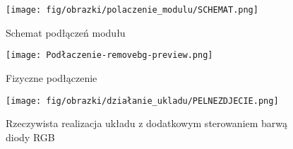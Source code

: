 \documentclass[11pt, a4paper]{article}
\begin{document}


\vspace{0.5cm}
\begin{figure}[h!]
    \centering
    \texttt{[image: fig/obrazki/polaczenie\_modulu/SCHEMAT.png]}
    \caption{Schemat podłączeń modułu}
    \label{fig:my_label}
\end{figure}
\vspace{0.5cm}

\vspace{0.5cm}
\begin{figure}[h!]
    \centering
    \texttt{[image: Podłaczenie-removebg-preview.png]}
    \caption{Fizyczne podłączenie}
    \label{fig:my_label}
\end{figure}
\vspace{0.5cm}



\vspace{0.5cm}
\begin{figure}[h!]
    \centering
    \texttt{[image: fig/obrazki/działanie\_ukladu/PELNEZDJECIE.png]}
    \caption{Rzeczywista realizacja układu z dodatkowym sterowaniem barwą diody RGB}
    \label{fig:my_label}
\end{figure}
\vspace{0.5cm}



\end{document}
